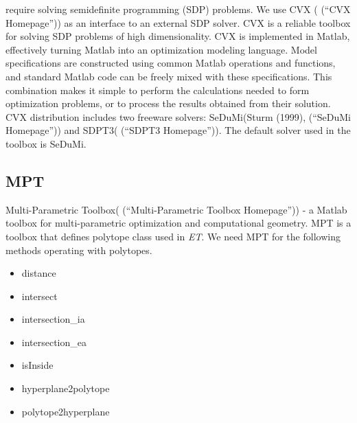 \documentclass[letterpaper,10pt,english]{sphinxmanual}
\begin{document}
require solving semidefinite programming (SDP) problems. We use CVX (
(“CVX Homepage”)) as an interface to an external SDP solver. CVX is a
reliable toolbox for solving SDP problems of high dimensionality. CVX is
implemented in Matlab, effectively turning Matlab into an optimization
modeling language. Model specifications are constructed using common
Matlab operations and functions, and standard Matlab code can be freely
mixed with these specifications. This combination makes it simple to
perform the calculations needed to form optimization problems, or to
process the results obtained from their solution. CVX distribution
includes two freeware solvers: SeDuMi(Sturm (1999), (“SeDuMi Homepage”))
and SDPT3( (“SDPT3 Homepage”)). The default solver used in the toolbox
is SeDuMi.


\subsection{MPT}
\label{chap_install:mpt}
Multi-Parametric Toolbox( (“Multi-Parametric Toolbox Homepage”)) - a
Matlab toolbox for multi-parametric optimization and computational
geometry. MPT is a toolbox that defines polytope class used in \emph{ET}. We
need MPT for the following methods operating with polytopes.
\begin{itemize}
\item {} 
distance

\item {} 
intersect

\item {} 
intersection\_ia

\item {} 
intersection\_ea

\item {} 
isInside

\item {} 
hyperplane2polytope

\item {} 
polytope2hyperplane

\end{itemize}
\end{document}
